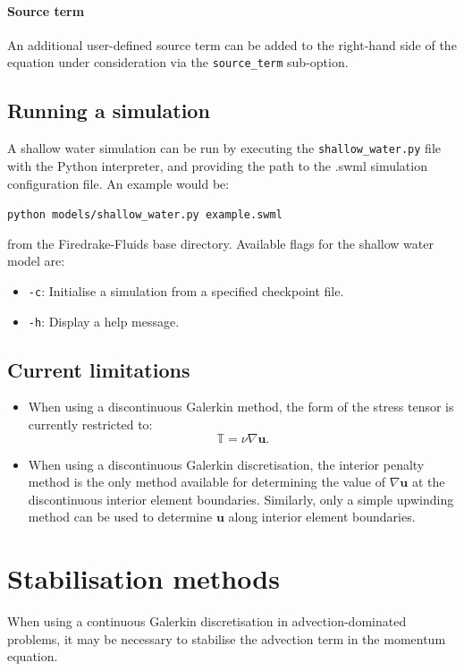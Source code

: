 \documentclass[a4paper,11pt]{report}
\begin{document}
\subsubsection{Source term}
An additional user-defined source term can be added to the right-hand side of the equation under consideration via the \texttt{source\_term} sub-option.

\section{Running a simulation}\label{sect:running_a_simulation}
A shallow water simulation can be run by executing the \texttt{shallow\_water.py} file with the Python interpreter, and providing the path to the .swml simulation configuration file. An example would be:

\texttt{python models/shallow\_water.py example.swml}

from the Firedrake-Fluids base directory. Available flags for the shallow water model are:

\begin{itemize}
   \item \texttt{-c}: Initialise a simulation from a specified checkpoint file.
   \item \texttt{-h}: Display a help message.
\end{itemize}

\section{Current limitations}
\begin{itemize}
   \item When using a discontinuous Galerkin method, the form of the stress tensor is currently restricted to:
   \begin{equation}
      \mathbb{T} = \nu\nabla\mathbf{u}.
   \end{equation}
   \item When using a discontinuous Galerkin discretisation, the interior penalty method \citep{Arnold_etal_2002} is the only method available for determining the value of $\nabla\mathbf{u}$ at the discontinuous interior element boundaries. Similarly, only a simple upwinding method can be used to determine $\mathbf{u}$ along interior element boundaries.
\end{itemize}


\chapter{Stabilisation methods}\label{chap:stabilisation}
When using a continuous Galerkin discretisation in advection-dominated problems, it may be necessary to stabilise the advection term in the momentum equation.
\end{document}
